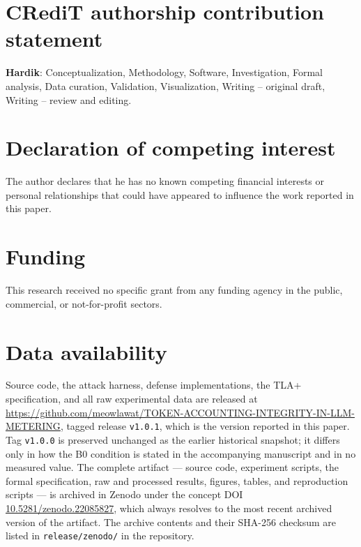 \documentclass[preprint,3p,authoryear,12pt]{elsarticle}
\begin{document}
\section*{CRediT authorship contribution statement}
\textbf{Hardik}: Conceptualization, Methodology, Software, Investigation, Formal
analysis, Data curation, Validation, Visualization, Writing -- original draft, Writing --
review and editing.

\section*{Declaration of competing interest}
The author declares that he has no known competing financial interests or personal
relationships that could have appeared to influence the work reported in this paper.

\section*{Funding}
This research received no specific grant from any funding agency in the public,
commercial, or not-for-profit sectors.

\section*{Data availability}
Source code, the attack harness, defense implementations, the TLA+ specification, and all
raw experimental data are released at
\url{https://github.com/meowlawat/TOKEN-ACCOUNTING-INTEGRITY-IN-LLM-METERING}, tagged
release \texttt{v1.0.1}, which is the version reported in this paper. Tag
\texttt{v1.0.0} is preserved unchanged as the earlier historical snapshot; it differs only
in how the B0 condition is stated in the accompanying manuscript and in no measured value.
The complete artifact --- source code, experiment scripts, the formal
specification, raw and processed results, figures, tables, and reproduction scripts ---
is archived in Zenodo under the concept DOI
\href{https://doi.org/10.5281/zenodo.22085827}{10.5281/zenodo.22085827}, which always
resolves to the most recent archived version of the artifact. The archive contents and their SHA-256 checksum are listed in
\texttt{release/zenodo/} in the repository.
\end{document}
